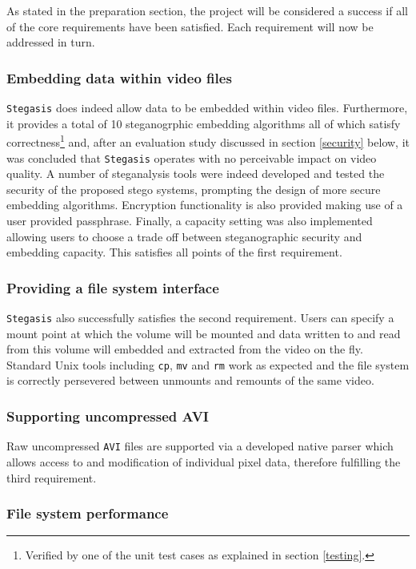 \documentclass[paper=a4, fontsize=11pt,twoside]{scrartcl}
\numberwithin{table}{section}
\numberwithin{figure}{section}
\numberwithin{algorithm}{section}
\begin{document}
As stated in the preparation section, the project will be considered a success if all of the core requirements have been satisfied. Each requirement will now be addressed in turn.

\subsubsection{Embedding data within video files}

\texttt{Stegasis} does indeed allow data to be embedded within video files. Furthermore, it provides a total of 10 steganogrphic embedding algorithms all of which satisfy correctness\footnote{Verified by one of the unit test cases as explained in section \ref{testing}.} and, after an evaluation study discussed in section \ref{security} below, it was concluded that \texttt{Stegasis} operates with no perceivable impact on video quality. A number of steganalysis tools were indeed developed and tested the security of the proposed stego systems, prompting the design of more secure embedding algorithms. Encryption functionality is also provided making use of a user provided passphrase. Finally, a capacity setting was also implemented allowing users to choose a trade off between steganographic security and embedding capacity. This satisfies all points of the first requirement.

\subsubsection{Providing a file system interface}

\texttt{Stegasis} also successfully satisfies the second requirement. Users can specify a mount point at which the volume will be mounted and data written to and read from this volume will embedded and extracted from the video on the fly. Standard Unix tools including \texttt{cp}, \texttt{mv} and \texttt{rm} work as expected and the file system is correctly persevered between unmounts and remounts of the same video.

\subsubsection{Supporting uncompressed AVI}

Raw uncompressed \texttt{AVI} files are supported via a developed native parser which allows access to and modification of individual pixel data, therefore fulfilling the third requirement.

\subsubsection{File system performance}
\end{document}
